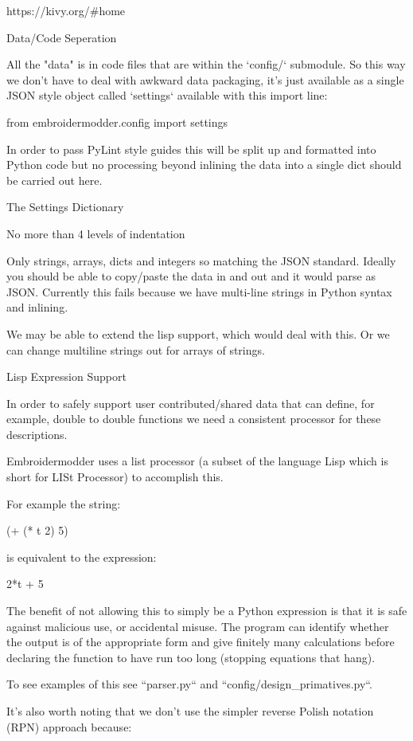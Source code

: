 \documentclass[a4paper]{report}
\begin{document}
{{https://kivy.org/#home

Data/Code Seperation
~~~~~~~~~~~~~~~~~~~~

All the "data" is in code files that are within the `config/`
submodule. So this way we don't have to deal with awkward data
packaging, it's just available as a single JSON style object
called `settings` available with this import line:

    from embroidermodder.config import settings

In order to pass PyLint style guides this will be split up and
formatted into Python code but no processing beyond inlining
the data into a single dict should be carried out here.

The Settings Dictionary
~~~~~~~~~~~~~~~~~~~~~~~

No more than 4 levels of indentation

Only strings, arrays, dicts and integers so matching the JSON standard. Ideally you should be able to copy/paste the data in and out and it would parse as JSON. Currently this fails because we have multi-line strings in Python syntax and inlining.

We may be able to extend the lisp support, which would deal with this. Or we can change multiline strings out for arrays of strings.

Lisp Expression Support
~~~~~~~~~~~~~~~~~~~~~~~

In order to safely support user contributed/shared data that can
define, for example, double to double functions we need a consistent
processor for these descriptions.

Embroidermodder uses a list processor (a subset of the language
Lisp which is short for LISt Processor) to accomplish this.

For example the string:

    (+ (* t 2) 5)

is equivalent to the expression:

    2*t + 5

The benefit of not allowing this to simply be a Python expression
is that it is safe against malicious use, or accidental misuse.
The program can identify whether the output is of the appropriate
form and give finitely many calculations before declaring the
function to have run too long (stopping equations that hang).

To see examples of this see ``parser.py`` and
``config/design_primatives.py``.

It's also worth noting that we don't use the simpler reverse Polish
notation (RPN) approach because:

}}
\end{document}
